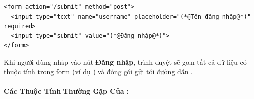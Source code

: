 \begin{codeWindow}[Cú pháp cơ bản của nút input type="submit"]
\begin{lstlisting}[language=HTML5]
<form action="/submit" method="post">
  <input type="text" name="username" placeholder="(*@Tên đăng nhập@*)" required>
  <input type="submit" value="(*@Đăng nhập@*)">
</form>
\end{lstlisting}
\end{codeWindow}

\begin{browserWindow}
\sffamily\small
{} \quad
{}
\end{browserWindow}

\begin{tipBox}
Khi người dùng nhấp vào nút \textbf{Đăng nhập}, trình duyệt sẽ gom tất cả dữ liệu có thuộc tính  trong form (ví dụ ) và đóng gói gửi tới đường dẫn .
\end{tipBox}

\paragraph{Các Thuộc Tính Thường Gặp Của :}

